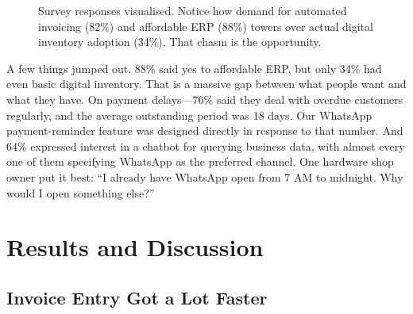 \documentclass[conference]{IEEEtran}
\begin{document}
\begin{figure}[htbp]
\begin{center}
\end{center}
\caption{Survey responses visualised. Notice how demand for automated invoicing (82\%) and affordable ERP (88\%) towers over actual digital inventory adoption (34\%). That chasm is the opportunity.}
\label{fig_survey}
\end{figure}

A few things jumped out. 88\% said yes to affordable ERP, but only 34\% had even basic digital inventory. That is a massive gap between what people want and what they have. On payment delays---76\% said they deal with overdue customers regularly, and the average outstanding period was 18 days. Our WhatsApp payment-reminder feature was designed directly in response to that number. And 64\% expressed interest in a chatbot for querying business data, with almost every one of them specifying WhatsApp as the preferred channel. One hardware shop owner put it best: ``I already have WhatsApp open from 7 AM to midnight. Why would I open something else?''

\section{Results and Discussion}

\subsection{Invoice Entry Got a Lot Faster}
\end{document}
